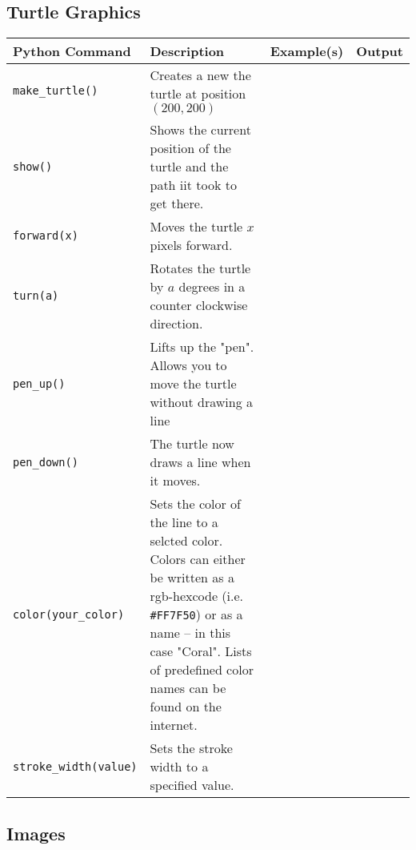 \documentclass[11pt,a4paper]{report}
\begin{document}
\subsection{Turtle Graphics}


\begin{longtable}{|p{}|p{}|p{}|p{}|}
\hline
Python Command & Description & Example(s) & Output  \\
\hline 
\endhead

\lstinline|make_turtle()| & Creates a new the turtle at position $(200,200)$ && \\
\hline
\lstinline|show()| & Shows the current position of the turtle and the path iit took to get there. &&\\
\hline
\lstinline|forward(x)| & Moves the turtle $x$ pixels forward. && \\
\hline
\lstinline|turn(a)| & Rotates the turtle by $a$ degrees in a counter clockwise direction. && \\
\hline
\lstinline|pen_up()| & Lifts up the "pen". Allows you to move the turtle without drawing a line && \\
\hline
\lstinline|pen_down()| & The turtle now draws a line when it moves. &&\\
\hline
\lstinline|color(your_color)| & Sets the color of the line to a selcted color. Colors can either be written as a rgb-hexcode (i.e. \verb|#FF7F50|) or as a name -- in this case "Coral". Lists of predefined color names can be found on the internet. &&\\
\hline
\lstinline|stroke_width(value)| & Sets the stroke width to a specified value. &&\\
\hline
\end{longtable}


\newpage
\subsection{Images}
\end{document}
